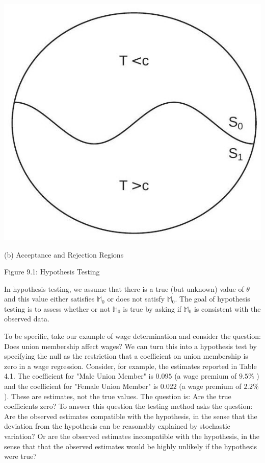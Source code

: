 \documentclass[10pt]{article}
\begin{document}
\includegraphics[max width=\textwidth]{2022_09_17_d22774979aa7978900adg-02(1)}

(b) Acceptance and Rejection Regions

Figure 9.1: Hypothesis Testing

In hypothesis testing, we assume that there is a true (but unknown) value of $\theta$ and this value either satisfies $\mathbb{M}_{0}$ or does not satisfy $\mathbb{M}_{0}$. The goal of hypothesis testing is to assess whether or not $\mathbb{H}_{0}$ is true by asking if $\mathbb{M}_{0}$ is consistent with the observed data.

To be specific, take our example of wage determination and consider the question: Does union membership affect wages? We can turn this into a hypothesis test by specifying the null as the restriction that a coefficient on union membership is zero in a wage regression. Consider, for example, the estimates reported in Table 4.1. The coefficient for "Male Union Member" is $0.095$ (a wage premium of $9.5 \%$ ) and the coefficient for "Female Union Member" is $0.022$ (a wage premium of $2.2 \%$ ). These are estimates, not the true values. The question is: Are the true coefficients zero? To answer this question the testing method asks the question: Are the observed estimates compatible with the hypothesis, in the sense that the deviation from the hypothesis can be reasonably explained by stochastic variation? Or are the observed estimates incompatible with the hypothesis, in the sense that that the observed estimates would be highly unlikely if the hypothesis were true?
\end{document}
